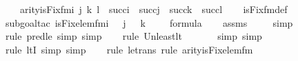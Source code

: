 \begin{isabellebody}
\ \ \ {\isachardoublequoteopen}arity{\isacharparenleft}{\kern0pt}is{\isacharunderscore}{\kern0pt}Fix{\isacharunderscore}{\kern0pt}fm{\isacharparenleft}{\kern0pt}i{\isacharcomma}{\kern0pt}\ j{\isacharcomma}{\kern0pt}\ k{\isacharcomma}{\kern0pt}\ l{\isacharparenright}{\kern0pt}{\isacharparenright}{\kern0pt}\ {\isasymle}\ succ{\isacharparenleft}{\kern0pt}i{\isacharparenright}{\kern0pt}\ {\isasymunion}\ succ{\isacharparenleft}{\kern0pt}j{\isacharparenright}{\kern0pt}\ {\isasymunion}\ succ{\isacharparenleft}{\kern0pt}k{\isacharparenright}{\kern0pt}\ {\isasymunion}\ succ{\isacharparenleft}{\kern0pt}l{\isacharparenright}{\kern0pt}{\isachardoublequoteclose}\isanewline
%
\isadelimproof
\isanewline
\ \ %
\endisadelimproof
%
\isatagproof
{}\isamarkupfalse%
\ is{\isacharunderscore}{\kern0pt}Fix{\isacharunderscore}{\kern0pt}fm{\isacharunderscore}{\kern0pt}def\isanewline
\ \ \isamarkupfalse%
{\isacharparenleft}{\kern0pt}subgoal{\isacharunderscore}{\kern0pt}tac\ {\isachardoublequoteopen}is{\isacharunderscore}{\kern0pt}Fix{\isacharunderscore}{\kern0pt}elem{\isacharunderscore}{\kern0pt}fm{\isacharparenleft}{\kern0pt}i\ {\isacharhash}{\kern0pt}{\isacharplus}{\kern0pt}\ {}{\isacharcomma}{\kern0pt}\ j\ {\isacharhash}{\kern0pt}{\isacharplus}{\kern0pt}\ {}{\isacharcomma}{\kern0pt}\ k\ {\isacharhash}{\kern0pt}{\isacharplus}{\kern0pt}\ {}{\isacharcomma}{\kern0pt}\ {}{\isacharparenright}{\kern0pt}\ {\isasymin}\ formula{\isachardoublequoteclose}{\isacharparenright}{\kern0pt}\isanewline
\ \ \isamarkupfalse%
\ assms\isanewline
\ \ \ \isamarkupfalse%
\ simp\isanewline
\ \ \ \isamarkupfalse%
{\isacharparenleft}{\kern0pt}rule\ pred{\isacharunderscore}{\kern0pt}le{\isacharcomma}{\kern0pt}\ simp{\isacharcomma}{\kern0pt}\ simp{\isacharparenright}{\kern0pt}\isanewline
\ \ \ \isamarkupfalse%
{\isacharparenleft}{\kern0pt}rule\ Un{\isacharunderscore}{\kern0pt}least{\isacharunderscore}{\kern0pt}lt{\isacharparenright}{\kern0pt}{\isacharplus}{\kern0pt}\isanewline
\ \ \ \ \ \isamarkupfalse%
\ {\isacharparenleft}{\kern0pt}simp{\isacharcomma}{\kern0pt}\ simp{\isacharparenright}{\kern0pt}\isanewline
\ \ \ \ \isamarkupfalse%
{\isacharparenleft}{\kern0pt}rule\ ltI{\isacharcomma}{\kern0pt}\ simp{\isacharcomma}{\kern0pt}\ simp{\isacharparenright}{\kern0pt}\isanewline
\ \ \ \isamarkupfalse%
{\isacharparenleft}{\kern0pt}rule\ le{\isacharunderscore}{\kern0pt}trans{\isacharcomma}{\kern0pt}\ rule\ arity{\isacharunderscore}{\kern0pt}is{\isacharunderscore}{\kern0pt}Fix{\isacharunderscore}{\kern0pt}elem{\isacharunderscore}{\kern0pt}fm{\isacharparenright}{\kern0pt}\isanewline

\end{isabellebody}
